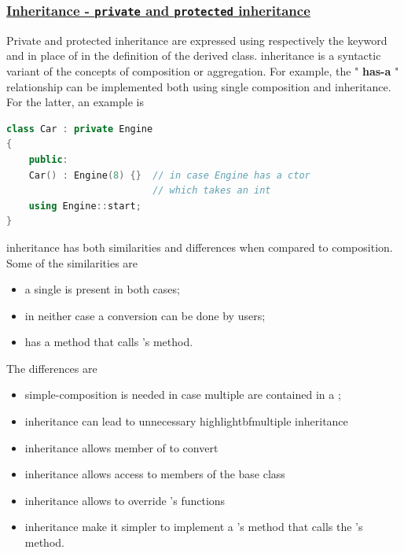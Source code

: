 \subsubsection{\href{https://isocpp.org/wiki/faq/private-inheritance}{\textbf{Inheritance - \texttt{private} and \texttt{protected} inheritance}}}
Private and protected inheritance are expressed using respectively the 
keyword  and  in place of 
 in the definition of the derived class.
\newline
{} inheritance is a syntactic variant of the concepts 
of composition or aggregation. For example, the " 
\textbf{has-a} " relationship can be implemented 
both using single composition and  inheritance. 
For the latter, an example is
\begin{lstlisting}[language=C++]
class Car : private Engine
{
    public:
    Car() : Engine(8) {}  // in case Engine has a ctor 
                          // which takes an int
    using Engine::start;
}
\end{lstlisting} 

 inheritance has both similarities and differences 
when compared to composition.
Some of the similarities are
\begin{itemize}
    \item a single  is present in both cases;
    \item in neither case a conversion  
    can be done by users;
    \item {} has a  method that 
    calls 's  method.
\end{itemize}

The differences are
\begin{itemize}
    \item simple-composition is needed in case multiple  
    are contained in a ;
    \item {} inheritance can lead to unnecessary 
    highlightbf{multiple inheritance}
    \item {} inheritance allows member of  
    to convert 
    \item {} inheritance allows access to 
     members of the base class
    \item {} inheritance allows  to 
    override 's  functions
    \item {} inheritance make it simpler to implement 
    a 's  method that calls the 
    's  method.
\end{itemize}

